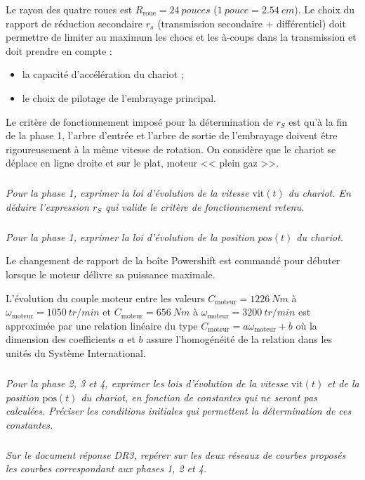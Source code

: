 \documentclass[10pt,fleqn]{article} %
\begin{document}
Le rayon des quatre roues est  $R_{\text{roue}}=\SI{24}{pouces}$ ($\SI{1}{pouce} = \SI{2,54}{cm}$). Le choix du rapport de réduction secondaire $r_s$ (transmission secondaire + différentiel) doit permettre de limiter au maximum les chocs et les à-coups dans la transmission et doit prendre en compte :
\begin{itemize}
\item la capacité d’accélération du chariot ;
\item le choix de pilotage de l’embrayage principal.
\end{itemize}

Le critère de fonctionnement imposé pour la détermination de $r_S$ est qu’à la fin de la phase 1, l’arbre d’entrée et l’arbre de sortie de l’embrayage doivent être rigoureusement à la même vitesse de rotation. 
On considère que le chariot se déplace en ligne droite et sur le plat, moteur << plein gaz >>.

\subparagraph{}
\textit{Pour la phase 1, exprimer la loi d’évolution de la vitesse $\text{vit}(t)$ du chariot. En déduire l’expression $r_S$ qui valide le critère de fonctionnement retenu.}



\subparagraph{}
\textit{Pour la phase 1, exprimer la loi d’évolution de la position $pos(t)$ du chariot.}

Le changement de rapport de la boîte Powershift est commandé pour débuter lorsque le moteur délivre sa puissance maximale. 

L’évolution du couple moteur entre les valeurs $C_{\text{moteur}} = \SI{1226}{Nm}$ à $\omega_{\text{moteur}}=\SI{1050}{tr/min}$ et $C_{\text{moteur}} = \SI{656}{Nm}$ à $\omega_{\text{moteur}}=\SI{3200}{tr/min}$ est approximée par une relation linéaire du type $C_{\text{moteur}} =a \omega_{\text{moteur}} + b$ où la dimension des coefficients $a$ et $b$ assure l’homogénéité de la relation dans les unités du Système International.

\subparagraph{}
\textit{Pour la phase 2, 3 et 4, exprimer les lois d’évolution de la vitesse $\text{vit}(t)$ et de la position $\text{pos}(t)$ du chariot, en fonction de constantes qui ne seront pas calculées. Préciser les conditions initiales qui permettent la détermination de ces constantes.}



\subparagraph{}
\textit{Sur le document réponse DR3, repérer sur les deux réseaux de courbes proposés les courbes correspondant aux phases 1, 2 et 4.}
\end{document}
